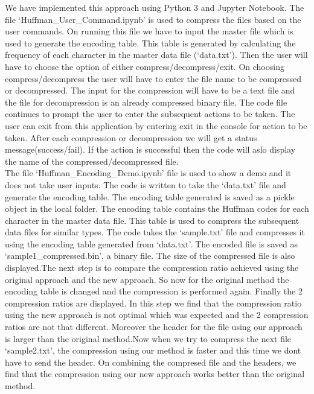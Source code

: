 \textnormal{
We have implemented this approach using Python 3 and Jupyter Notebook. The file `Huffman\_User\_Command.ipynb' is used to compress the files based on the user commands. On running this file we have to input the master file which is used to generate the encoding table. This table is generated by calculating the frequency of each character in the master data file (`data.txt'). Then the user will have to choose the option of either compress/decompress/exit. On choosing compress/decompress the user will have to enter the file name to be compressed or decompressed. The input for the compression will have to be a text file and the file for decompression is an already compressed binary file. The code file continues to prompt the user to enter the subsequent actions to be taken. The user can exit from this application by entering exit in the console for action to be taken. After each compression or decompression we will get a status message(success/fail). If the action is successful then the code will aslo display the name of the compressed/decompressed file.
\\
The file `Huffman\_Encoding\_Demo.ipynb' file is used to show a demo and it does not take user inputs. The code is written to take the `data.txt' file and generate the encoding table. The encoding table generated is saved as a pickle object in the local folder. The encoding table contains the Huffman codes for each character in the master data file. This table is used to compress the subsequent data files for similar types. The code takes the `sample.txt' file and compresses it using the encoding table generated from `data.txt'. The encoded file is saved as `sample1\_compressed.bin', a binary file. The size of the compressed file is also displayed.The next step is to compare the compression ratio achieved using the original approach and the new approach. So now for the original method the encoding table is changed and the compression is performed again. Finally the 2 compression ratios are displayed. In this step we find that the compression ratio using the new approach is not optimal which was expected and the 2 compression ratios are not that different. Moreover the header for the file using our approach is larger than the original method.Now when we try to compress the next file `sample2.txt', the compression using our method is faster and this time we dont have to send the header. On combining the compresed file and the headers, we find that the compression using our new approach works better than the original method.
\\
}
